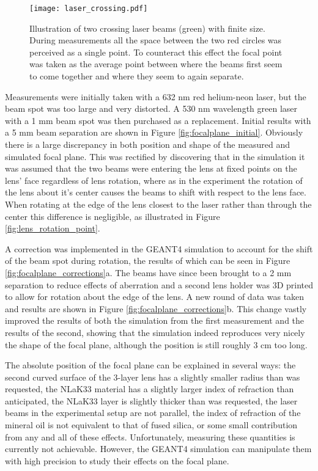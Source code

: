 \begin{figure}[!htb]
	\centering
	\texttt{[image: laser\_crossing.pdf]}
	\caption[Illustration of two crossing laser beams (green) with finite size.]{Illustration of two crossing laser beams (green) with finite size. During measurements all the space between the two red circles was perceived as a single point. To counteract this effect the focal point was taken as the average point between where the beams first seem to come together and where they seem to again separate.}
	\label{fig:laser_crossing}
\end{figure}

Measurements were initially taken with a 632 nm red helium-neon laser, but the beam spot was too large and very distorted. A 530 nm wavelength green laser with a 1 mm beam spot was then purchased as a replacement. Initial results with a 5 mm beam separation are shown in Figure \ref{fig:focalplane_initial}. Obviously there is a large discrepancy in both position and shape of the measured and simulated focal plane. This was rectified by discovering that in the simulation it was assumed that the two beams were entering the lens at fixed points on the lens' face regardless of lens rotation, where as in the experiment the rotation of the lens about it's center causes the beams to shift with respect to the lens face. When rotating at the edge of the lens closest to the laser rather than through the center this difference is negligible, as illustrated in Figure \ref{fig:lens_rotation_point}.

A correction was implemented in the GEANT4 simulation to account for the shift of the beam spot during rotation, the results of which can be seen in Figure \ref{fig:focalplane_corrections}a. The beams have since been brought to a 2 mm separation to reduce effects of aberration and a second lens holder was 3D printed to allow for rotation about the edge of the lens. A new round of data was taken and results are shown in Figure \ref{fig:focalplane_corrections}b. This change vastly improved the results of both the simulation from the first measurement and the results of the second, showing that the simulation indeed reproduces very nicely the shape of the focal plane, although the position is still roughly 3 cm too long.

The absolute position of the focal plane can be explained in several ways: the second curved surface of the 3-layer lens has a slightly smaller radius than was requested, the NLaK33 material has a slightly larger index of refraction than anticipated, the NLaK33 layer is slightly thicker than was requested, the laser beams in the experimental setup are not parallel, the index of refraction of the mineral oil is not equivalent to that of fused silica, or some small contribution from any and all of these effects. Unfortunately, measuring these quantities is currently not achievable. However, the GEANT4 simulation can manipulate them with high precision to study their effects on the focal plane.

